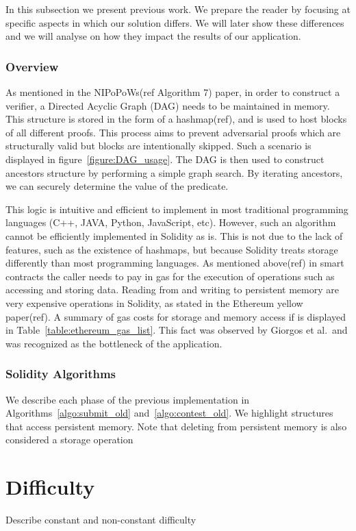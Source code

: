 In this subsection we present previous work. We prepare the reader by focusing
at specific aspects in which our solution differs. We will later show these
differences and we will analyse on how they impact the results of our
application.

\subsubsection{Overview} As mentioned in the NIPoPoWs(ref Algorithm 7) paper,
in order to construct a verifier, a Directed Acyclic Graph (DAG) needs to be
maintained in memory. This structure is stored in the form of a hashmap(ref),
and is used to host blocks of all different proofs. This process aims to
prevent adversarial proofs which are structurally valid but blocks are
intentionally skipped. Such a scenario is displayed in
figure~\ref{figure:DAG_usage}. The DAG is then used to construct ancestors
structure by performing a simple graph search. By iterating ancestors, we can
securely determine the value of the predicate.


This logic is intuitive and efficient to implement in most traditional
programming languages (C++, JAVA, Python, JavaScript, etc). However, such an
algorithm cannot be efficiently implemented in Solidity as is. This is not due
to the lack of features, such as the existence of hashmaps, but because
Solidity treats storage differently than most programming languages. As
mentioned above(ref) in smart contracts the caller needs to pay in gas for the
execution of operations such as accessing and storing data. Reading from and
writing to persistent memory are very expensive operations in Solidity, as
stated in the Ethereum yellow paper(ref). A summary of gas costs for storage
and memory access if is displayed in Table~\ref{table:ethereum_gas_list}. This
fact was observed by Giorgos et al.\ and was recognized as the bottleneck of
the application.

%

\subsubsection{Solidity Algorithms}

We describe each phase of the previous implementation in
Algorithms~\ref{algo:submit_old} and~\ref{algo:contest_old}. We highlight
structures that access persistent memory. Note that deleting from persistent
memory is also considered a storage operation

%


\section{Difficulty}

Describe constant and non-constant difficulty
